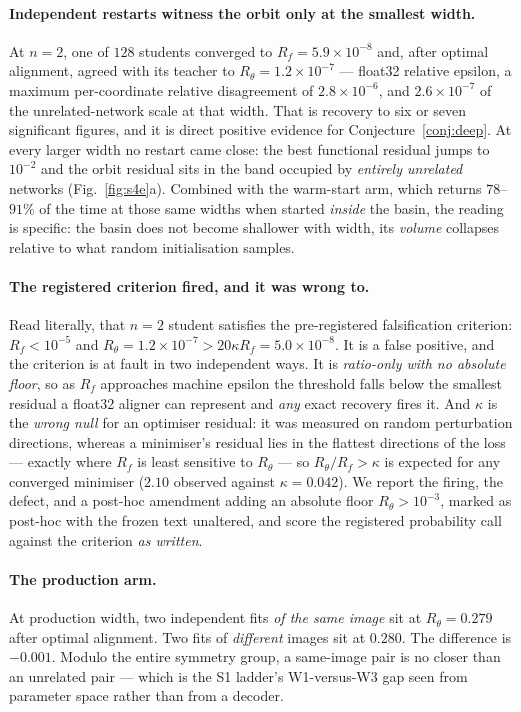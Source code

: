\documentclass[10pt,letterpaper]{article}
\theoremstyle{definition}
\begin{document}
\paragraph{Independent restarts witness the orbit only at the smallest width.} At $n=2$, one of
$128$ students converged to $R_f = 5.9\times10^{-8}$ and, after optimal alignment, agreed with its
teacher to $R_\theta = 1.2\times10^{-7}$ --- float32 relative epsilon, a maximum per-coordinate
relative disagreement of $2.8\times10^{-6}$, and $2.6\times10^{-7}$ of the unrelated-network scale
at that width. That is recovery to six or seven significant figures, and it is direct positive
evidence for Conjecture~\ref{conj:deep}. At every larger width no restart came close: the best
functional residual jumps to $10^{-2}$ and the orbit residual sits in the band occupied by
\emph{entirely unrelated} networks (Fig.~\ref{fig:s4e}a). Combined with the warm-start arm, which
returns $78$--$91\%$ of the time at those same widths when started \emph{inside} the basin, the
reading is specific: the basin does not become shallower with width, its \emph{volume} collapses
relative to what random initialisation samples.

\paragraph{The registered criterion fired, and it was wrong to.} Read literally, that $n=2$ student
satisfies the pre-registered falsification criterion: $R_f < 10^{-5}$ and
$R_\theta = 1.2\times10^{-7} > 20\kappa R_f = 5.0\times10^{-8}$. It is a false positive, and the
criterion is at fault in two independent ways. It is \emph{ratio-only with no absolute floor}, so
as $R_f$ approaches machine epsilon the threshold falls below the smallest residual a float32
aligner can represent and \emph{any} exact recovery fires it. And $\kappa$ is the \emph{wrong null}
for an optimiser residual: it was measured on random perturbation directions, whereas a minimiser's
residual lies in the flattest directions of the loss --- exactly where $R_f$ is least sensitive to
$R_\theta$ --- so $R_\theta/R_f > \kappa$ is expected for any converged minimiser ($2.10$ observed
against $\kappa = 0.042$). We report the firing, the defect, and a post-hoc amendment adding an
absolute floor $R_\theta > 10^{-3}$, marked as post-hoc with the frozen text unaltered, and score
the registered probability call against the criterion \emph{as written}.

\paragraph{The production arm.} At production width, two independent fits \emph{of the same image}
sit at $R_\theta = 0.279$ after optimal alignment. Two fits of \emph{different} images sit at
$0.280$. The difference is $-0.001$. Modulo the entire symmetry group, a same-image pair is no
closer than an unrelated pair --- which is the S1 ladder's W1-versus-W3 gap seen from parameter
space rather than from a decoder.
\end{document}

